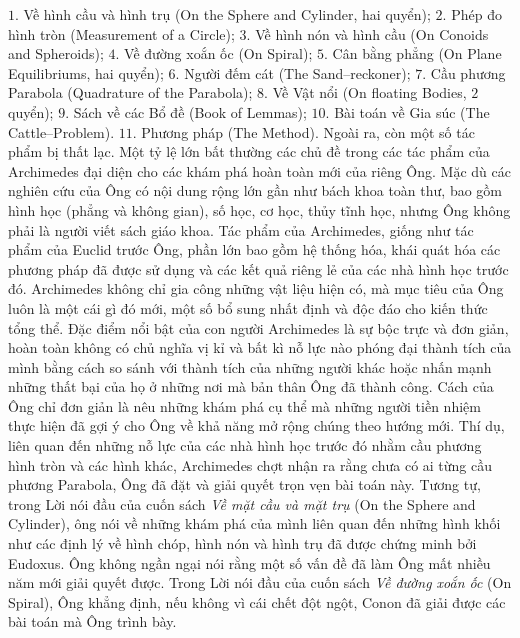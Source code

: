 \begin{multicols}{2}
	\vskip 0.1cm
	$1.$ Về hình cầu và hình trụ (On the Sphere and Cylinder, hai quyển);
	\vskip 0.1cm
	$2.$ Phép đo hình tròn (Measurement of a Circle); 
	\vskip 0.1cm
	$3.$ Về hình nón và hình cầu (On Conoids and Spheroids); 
	\vskip 0.1cm
	$4.$ Về đường xoắn ốc (On Spiral);
	\vskip 0.1cm
	$5.$ Cân bằng phẳng (On Plane Equilibriums, hai quyển);
	\vskip 0.1cm
	$6.$ Người đếm cát (The Sand--reckoner);
	\vskip 0.1cm
	$7.$ Cầu phương Parabola (Quadrature of the Parabola);
	\vskip 0.1cm
	$8.$ Về Vật nổi (On floating Bodies, $2$ quyển); 
	\vskip 0.1cm
	$9.$ Sách về các Bổ đề (Book of Lemmas);
	\vskip 0.1cm
	$10.$ Bài toán về Gia súc (The Cattle--Problem). 
	\vskip 0.1cm
	$11.$ Phương pháp (The Method).
	\vskip 0.1cm
	Ngoài ra, còn một số tác phẩm bị thất lạc.
	\vskip 0.1cm
	Một tỷ lệ lớn bất thường các chủ đề trong các tác phẩm của Archimedes đại diện cho các khám phá hoàn toàn mới của riêng Ông. Mặc dù các nghiên cứu của Ông có nội dung rộng lớn gần như bách khoa toàn thư, bao gồm hình học (phẳng và không gian), số học, cơ học, thủy tĩnh học, nhưng Ông không phải là người viết sách giáo khoa. Tác phẩm của Archimedes, giống như tác phẩm của Euclid trước Ông, phần lớn bao gồm hệ thống hóa, khái quát hóa các phương pháp đã được sử dụng và các kết quả riêng lẻ của các nhà hình học trước đó. Archimedes không chỉ gia công những vật liệu hiện có, mà mục tiêu của Ông luôn là một cái gì đó mới, một số bổ sung nhất định và độc đáo cho kiến thức tổng thể. 
	\vskip 0.1cm
	Đặc điểm nổi bật của con người Archimedes là sự bộc trực và đơn giản, hoàn toàn không có chủ nghĩa vị kỉ và bất kì nỗ lực nào phóng đại thành tích của mình bằng cách so sánh với thành tích của những người khác hoặc nhấn mạnh những thất bại của họ ở những nơi mà bản thân Ông đã thành công. Cách của Ông chỉ đơn giản là nêu những khám phá cụ thể mà những người tiền nhiệm thực hiện đã gợi ý cho Ông về khả năng mở rộng chúng theo hướng mới. Thí dụ, liên quan đến những nỗ lực của các nhà hình học trước đó nhằm cầu phương hình tròn và các hình khác, Archimedes chợt nhận ra rằng chưa có ai từng cầu phương Parabola, Ông đã đặt và giải quyết trọn vẹn bài toán này. Tương tự, trong Lời nói đầu của cuốn sách \textit{Về mặt cầu và mặt trụ} (On the Sphere and Cylinder), ông nói về những khám phá của mình liên quan đến những hình khối như các định lý về hình chóp, hình nón và hình trụ đã được chứng minh bởi Eudoxus.  Ông không ngần ngại nói rằng một số vấn đề đã làm Ông mất nhiều năm mới giải quyết được. Trong Lời nói đầu của cuốn sách \textit{Về đường xoắn ốc} (On Spiral), Ông khẳng định, nếu không vì cái chết đột ngột, Conon đã giải được các bài toán mà Ông trình bày. 

\end{multicols}
